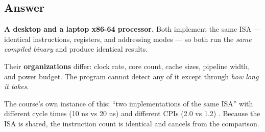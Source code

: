 \subsection*{Answer}

\begin{answerbox}
\textbf{A desktop and a laptop x86-64 processor.} Both implement the same ISA —
identical instructions, registers, and addressing modes — so both run the
\emph{same compiled binary} and produce identical results.

\medskip
Their \textbf{organizations} differ: clock rate, core count, cache sizes,
pipeline width, and power budget. The program cannot detect any of it except
through \emph{how long it takes}.

\medskip
The course's own instance of this: ``two implementations of the same ISA'' with
different cycle times (10 ns vs 20 ns) and different CPIs (2.0 vs 1.2)
. Because the ISA is shared, the instruction count is identical
and cancels from the comparison.
\end{answerbox}


